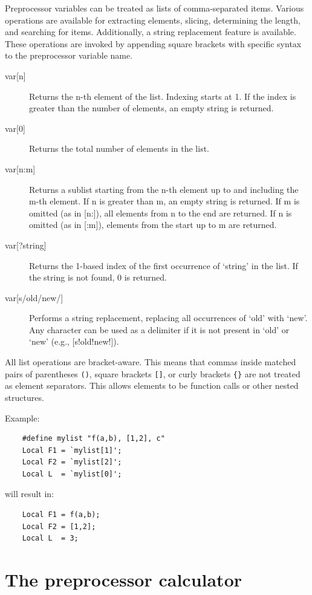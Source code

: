 \noindent Preprocessor variables can be treated as lists of comma-separated items. 
Various operations are available for extracting elements, slicing, determining 
the length, and searching for items. Additionally, a string replacement feature 
is available. These operations are invoked by appending square brackets with 
specific syntax to the preprocessor variable name.

\begin{description}
\item[{var[n]}] Returns the n-th element of the list. Indexing starts at 1. If 
the index is greater than the number of elements, an empty string is 
returned.
\item[{var[0]}] Returns the total number of elements in the list.
\item[{var[n:m]}] Returns a sublist starting from the n-th element up to and 
including the m-th element. If n is greater than m, an empty string is 
returned. 
If m is omitted (as in [n:]), all elements from n to the end are returned. 
If n is omitted (as in [:m]), elements from the start up to m are returned.
\item[{var[?string]}] Returns the 1-based index of the first occurrence of 
`string' in the list. If the string is not found, 0 is returned.
\item[{var[s/old/new/]}] Performs a string replacement, replacing all 
occurrences of `old' with `new'. Any character can be used as a delimiter if it 
is not present in `old' or `new' (e.g., [s!old!new!]).
\end{description}

\noindent All list operations are bracket-aware. This means that commas inside 
matched pairs of parentheses \verb:():, square brackets \verb:[]:, or curly 
brackets \verb:{}: are not treated as element separators. This allows 
elements to be function calls or other nested structures.

Example:
\begin{verbatim}
    #define mylist "f(a,b), [1,2], c"
    Local F1 = `mylist[1]';
    Local F2 = `mylist[2]';
    Local L  = `mylist[0]';
\end{verbatim}
will result in:
\begin{verbatim}
    Local F1 = f(a,b);
    Local F2 = [1,2];
    Local L  = 3;
\end{verbatim}

\section{The preprocessor calculator}
\label{calculator}

